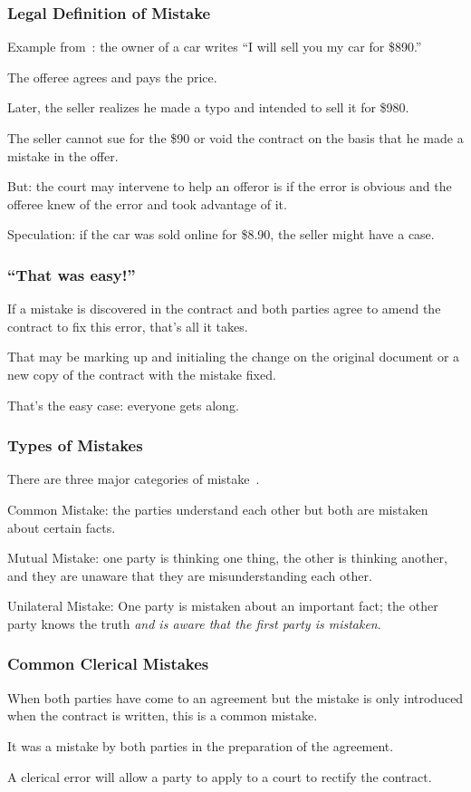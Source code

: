 \begin{frame}
\frametitle{Legal Definition of Mistake}

Example from~\cite{lba}: the owner of a car writes ``I will sell you my car for \$890.''

The offeree agrees and pays the price. 

Later, the seller realizes he made a typo and intended to sell it for \$980.

The seller cannot sue for the \$90 or void the contract on the basis that he made a mistake in the offer.

But: the court may intervene to help an offeror is if the error is obvious and the offeree knew of the error and took advantage of it.

Speculation: if the car was sold online for \$8.90, the seller might have a case.


\end{frame}


\begin{frame}
\frametitle{``That was easy!''}

If a mistake is discovered in the contract and both parties agree to amend the contract to fix this error, that's all it takes.

That may be marking up and initialing the change on the original document or a new copy of the contract with the mistake fixed.

That's the easy case: everyone gets along. 

\end{frame}



\begin{frame}
\frametitle{Types of Mistakes}

There are three major categories of mistake~\cite{lba}.

\alert{Common Mistake}: the parties understand each other but both are mistaken about certain facts.

\alert{Mutual Mistake}: one party is thinking one thing, the other is thinking another, and they are unaware that they are misunderstanding each other.

\alert{Unilateral Mistake}: One party is mistaken about an important fact; the other party knows the truth \textit{and is aware that the first party is mistaken}.


\end{frame}


\begin{frame}
\frametitle{Common Clerical Mistakes}

When both parties have come to an agreement but the mistake is only introduced when the contract is written, this is a common mistake.

It was a mistake by both parties in the preparation of the agreement.

A clerical error will allow a party to apply to a court to \alert{rectify} the contract.

\end{frame}


